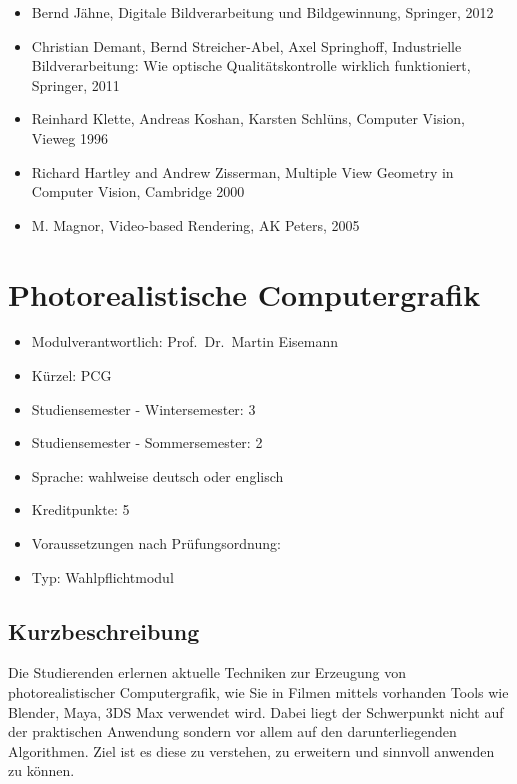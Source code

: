 \begin{itemize}
\item
  Bernd Jähne, Digitale Bildverarbeitung und Bildgewinnung, Springer,
  2012
\item
  Christian Demant, Bernd Streicher-Abel, Axel Springhoff, Industrielle
  Bildverarbeitung: Wie optische Qualitätskontrolle wirklich
  funktioniert, Springer, 2011
\item
  Reinhard Klette, Andreas Koshan, Karsten Schlüns, Computer Vision,
  Vieweg 1996
\item
  Richard Hartley and Andrew Zisserman, Multiple View Geometry in
  Computer Vision, Cambridge 2000
\item
  M. Magnor, Video-based Rendering, AK Peters, 2005
\end{itemize}

\chapter{Photorealistische
Computergrafik}\label{photorealistische-computergrafik}

\begin{itemize}
\tightlist
\item
  Modulverantwortlich: Prof.~Dr.~Martin Eisemann
\item
  Kürzel: PCG
\item
  Studiensemester - Wintersemester: 3
\item
  Studiensemester - Sommersemester: 2
\item
  Sprache: wahlweise deutsch oder englisch
\item
  Kreditpunkte: 5
\item
  Voraussetzungen nach Prüfungsordnung: ~
\item
  Typ: Wahlpflichtmodul
\end{itemize}

\section*{Kurzbeschreibung}\label{kurzbeschreibung-7}

Die Studierenden erlernen aktuelle Techniken zur Erzeugung von
photorealistischer Computergrafik, wie Sie in Filmen mittels vorhanden
Tools wie Blender, Maya, 3DS Max verwendet wird. Dabei liegt der
Schwerpunkt nicht auf der praktischen Anwendung sondern vor allem auf
den darunterliegenden Algorithmen. Ziel ist es diese zu verstehen, zu
erweitern und sinnvoll anwenden zu können.

